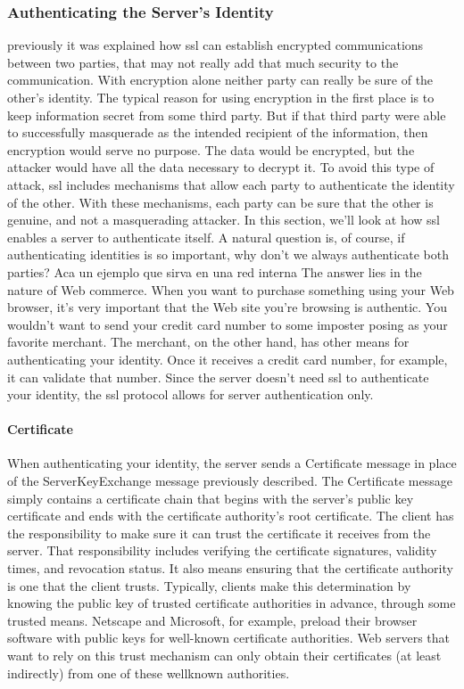 \subsubsection{Authenticating the Server’s Identity}
previously it was explained how ssl can establish encrypted
communications between two parties, that may not really add that
much security to the communication. With encryption alone neither
party can really be sure of the other’s identity. The typical reason for
using encryption in the first place is to keep information secret from
some third party. But if that third party were able to successfully
masquerade as the intended recipient of the information, then encryption 
would serve no purpose. The data would be encrypted, but
the attacker would have all the data necessary to decrypt it.
To avoid this type of attack, ssl includes mechanisms that allow each
party to authenticate the identity of the other. With these mechanisms, 
each party can be sure that the other is genuine, and not a
masquerading attacker. In this section, we’ll look at how ssl enables a
server to authenticate itself.
A natural question is, of course, if authenticating identities is so important,
 why don’t we always authenticate both parties? 
 Aca un ejemplo que sirva en una red interna
 The answer
lies in the nature of Web commerce. When you want to purchase
something using your Web browser, it’s very important that the Web
site you’re browsing is authentic. You wouldn’t want to send your
credit card number to some imposter posing as your favorite merchant. 
The merchant, on the other hand, has other means for
authenticating your identity. Once it receives a credit card number,
for example, it can validate that number. Since the server doesn’t
need ssl to authenticate your identity, the ssl protocol allows for
server authentication only. 

\paragraph{Certificate}
When authenticating your identity, the server sends a Certificate message 
in place of the ServerKeyExchange message previously described. The Certificate 
message simply contains a certificate chain
that begins with the server’s public key certificate and ends with the
certificate authority’s root certificate.
The client has the responsibility to make sure it can trust the certificate it 
receives from the server. That responsibility includes verifying
the certificate signatures, validity times, and revocation status. It also
means ensuring that the certificate authority is one that the client
trusts. Typically, clients make this determination by knowing the
public key of trusted certificate authorities in advance, through some
trusted means. Netscape and Microsoft, for example, preload their
browser software with public keys for well-known certificate authorities. 
Web servers that want to rely on this trust mechanism can only
obtain their certificates (at least indirectly) from one of these wellknown
 authorities.

